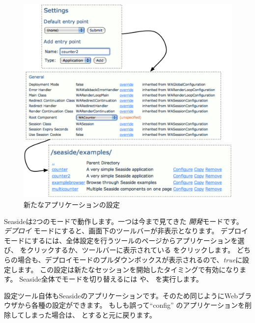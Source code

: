 \documentclass[a4paper,10pt,twoside]{book}
\begin{document}
\begin{figure}[ht]
\begin{center}
\includegraphics[width=\textwidth]{counter2}
\caption{新たなアプリケーションの設定}
\end{center}
\end{figure}

Seasideは2つのモードで動作します。一つは今まで見てきた \emph{開発}モードです。 \emph{デプロイ} モードにすると、画面下のツールバーが非表示となります。
デプロイモードにするには、全体設定を行うツールのページからアプリケーションを選び、  をクリックするか、ツールバーに表示されている  をクリックします。
どちらの場合も、デプロイモードのプルダウンボックスが表示されるので、\emph{true}に設定します。
この設定は新たなセッションを開始したタイミングで有効になります。
Seaside全体でモードを切り替えるには や、
を実行します。

設定ツール自体もSeasideのアプリケーションです。そのため同じようにWebブラウザから各種の設定ができます。
もしも誤って``config'' のアプリケーションを削除してしまった場合は、
  とすると元に戻ります。
\end{document}
